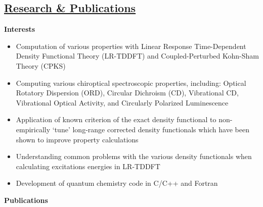 \documentclass[12pt,letterpaper,oneside]{article}
\newcommand{\MYh}[1]{ \underline{#1} }
\begin{document}
\subsection*{\MYh{Research \& Publications}}\textbf{Interests}
\begin{itemize}
	\item Computation of various properties with Linear Response Time-Dependent Density Functional Theory (LR-TDDFT) and Coupled-Perturbed Kohn-Sham Theory (CPKS)
	\item Computing various chiroptical spectroscopic properties, including: Optical Rotatory Dispersion (ORD), Circular Dichroism (CD), Vibrational CD, Vibrational Optical Activity, and Circularly Polarized Luminescence
	\item Application of known criterion of the exact density functional to non-empirically `tune' long-range corrected density functionals which have been shown to improve property calculations
	\item Understanding common problems with the various density functionals when calculating excitations energies in LR-TDDFT
	\item Development of quantum chemistry code in C/C++ and Fortran
\end{itemize}\textbf{Publications}
\end{document}
